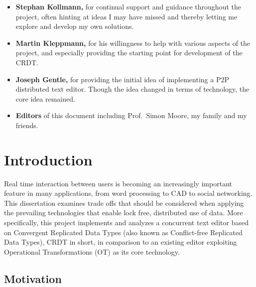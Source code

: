\documentclass[12pt,a4paper,twoside,openright]{report}
\begin{document}
\begin{itemize}
	\item{\textbf{Stephan Kollmann,} for continual support and guidance throughout the project, often hinting at ideas I may have missed and thereby letting me explore and develop my own solutions.}
	
	\item{\textbf{Martin Kleppmann,} for his willingness to help with various aspects of the project, and especially providing the starting point for development of the CRDT.}
	
	\item{\textbf{Joseph Gentle,} for providing the initial idea of implementing a P2P distributed text editor. Though the idea changed in terms of technology, the core idea remained.}
	
	\item{\textbf{Editors} of this document including Prof.~Simon Moore, my family and my friends.}
	
\end{itemize}



\pagestyle{headings}

\chapter{Introduction}

Real time interaction between users is becoming an increasingly important feature in many applications, from word processing to CAD to social networking. This dissertation examines trade offs that should be considered when applying the prevailing technologies that enable lock free, distributed use of data. More specifically, this project implements and analyzes a concurrent text editor based on Convergent Replicated Data Types (also known as Conflict-free Replicated Data Types), CRDT in short, in comparison to an existing editor exploiting Operational Transformations (OT) as its core technology.


\section{Motivation}
\end{document}
